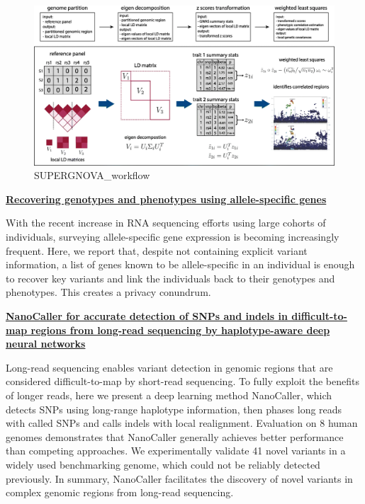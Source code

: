 \documentclass[
]{book}
\begin{document}
\begin{figure}
\centering
\includegraphics{./figs/pubmon/2021-2022/SUPERGNOVA_workflow.png}
\caption{SUPERGNOVA\_workflow}
\end{figure}

\textbf{\href{https://genomebiology.biomedcentral.com/articles/10.1186/s13059-021-02477-x}{Recovering genotypes and phenotypes using allele-specific genes}\citep{gursoy2021recovering}}

With the recent increase in RNA sequencing efforts using large cohorts of individuals, surveying allele-specific gene expression is becoming increasingly frequent. Here, we report that, despite not containing explicit variant information, a list of genes known to be allele-specific in an individual is enough to recover key variants and link the individuals back to their genotypes and phenotypes. This creates a privacy conundrum.

\textbf{\href{https://genomebiology.biomedcentral.com/articles/10.1186/s13059-021-02472-2}{NanoCaller for accurate detection of SNPs and indels in difficult-to-map regions from long-read sequencing by haplotype-aware deep neural networks}\citep{ahsan2021nanocaller}}

Long-read sequencing enables variant detection in genomic regions that are considered difficult-to-map by short-read sequencing. To fully exploit the benefits of longer reads, here we present a deep learning method NanoCaller, which detects SNPs using long-range haplotype information, then phases long reads with called SNPs and calls indels with local realignment. Evaluation on 8 human genomes demonstrates that NanoCaller generally achieves better performance than competing approaches. We experimentally validate 41 novel variants in a widely used benchmarking genome, which could not be reliably detected previously. In summary, NanoCaller facilitates the discovery of novel variants in complex genomic regions from long-read sequencing.
\end{document}
